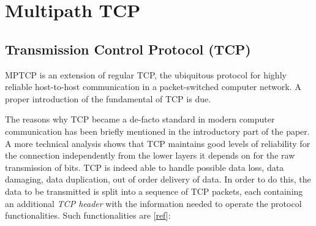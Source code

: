 \chapter{Multipath TCP}
\label{chap:multipathtcp}

\section{Transmission Control Protocol (TCP)}
MPTCP is an extension of regular TCP, the ubiquitous protocol for highly reliable host-to-host communication in a packet-switched computer network. A proper introduction of the fundamental of TCP is due.


The reasons why TCP became a de-facto standard in modern computer communication has been briefly mentioned in the introductory part of the paper. A more technical analysis shows that TCP maintains good levels of reliability for the connection independently from the lower layers it depends on for the raw transmission of bits. TCP is indeed able to handle possible data loss, data damaging, data duplication, out of order delivery of data. In order to do this, the data to be transmitted is split into a sequence of TCP packets, each containing an additional \textit{TCP header} with the information needed to operate the protocol functionalities. Such functionalities are [\href{https://tools.ietf.org/html/rfc793}{ref}]:

